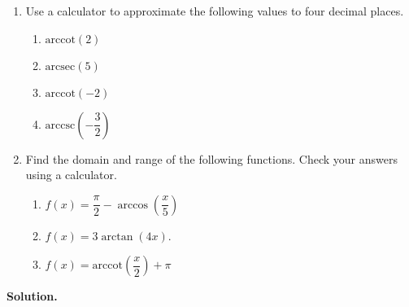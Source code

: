 \documentclass[12pt]{ximera}
\begin{document}
\begin{example} \label{arcstuffoncalc} $~$

\begin{enumerate}

\item Use a calculator to approximate the following values to four decimal places.

\begin{multicols}{4}

\begin{enumerate}

\item  $\mbox{arccot}(2)$ 

\item  $\mbox{arcsec}(5)$ 

\item \label{arccotneg2} $\mbox{arccot}(-2)$ 

\item  $\mbox{arccsc}\left(-\dfrac{3}{2}\right)$

\end{enumerate}

\end{multicols}

\item  Find the domain and range of the following functions. Check your answers using a calculator.

\begin{multicols}{3}

\begin{enumerate}

\item  $f(x) = \dfrac{\pi}{2} - \arccos\left(\dfrac{x}{5}\right)$

\item  $f(x) = 3\arctan\left(4x \right)$. 

\item  \label{arccotangentcalc} $f(x) = \text{arccot}\left(\dfrac{x}{2} \right) + \pi$

\end{enumerate}

\end{multicols}

\end{enumerate}


{\bf Solution.}

\begin{enumerate}


\end{enumerate}
\end{example}
\end{document}
